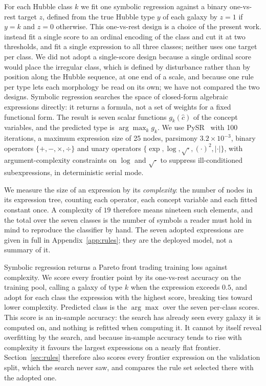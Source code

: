 \documentclass[11pt]{article}
\begin{document}
For each Hubble class $k$ we fit one symbolic regression against a binary
one-vs-rest target $z$, defined from the true Hubble type $y$ of each galaxy by
$z = 1$ if $y = k$ and $z = 0$ otherwise. This one-vs-rest design is a choice
of the present work. \citet{deshpande2026} instead fit a single score to an
ordinal encoding of the class and cut it at two thresholds, and
\citet{llorella2025} fit a single expression to all three classes; neither uses
one target per class. We did not adopt a single-score design because a single
ordinal score would place the irregular class, which is defined
by disturbance rather than by position along the Hubble sequence, at one end of
a scale, and because one rule per type lets each morphology be read on its own;
we have not compared the two designs. Symbolic regression searches the space of
closed-form algebraic expressions directly: it returns a formula, not a set of
weights for a fixed functional form. The result is seven scalar functions
$g_k(\hat c)$ of the concept variables, and the predicted type is
$\arg\max_k g_k$. We use PySR~\citep{cranmer2023} with 100 iterations, a
maximum expression size of 25 nodes, parsimony $3.2\times10^{-3}$, binary
operators $\{+,-,\times,\div\}$ and unary operators
$\{\exp,\log,\sqrt{\cdot},(\cdot)^2,|\cdot|\}$, with argument-complexity
constraints on $\log$ and $\sqrt{\cdot}$ to suppress ill-conditioned
subexpressions, in deterministic serial mode.

We measure the size of an expression by its \emph{complexity}: the number of
nodes in its expression tree, counting each operator, each concept variable
and each fitted constant once. A complexity of $19$ therefore means nineteen
such elements, and the total over the seven classes is the number of symbols a
reader must hold in mind to reproduce the classifier by hand. The seven
adopted expressions are given in full in Appendix~\ref{app:rules}; they are
the deployed model, not a summary of it.

Symbolic regression returns a Pareto front trading training loss against
complexity. We score every frontier point by its one-vs-rest accuracy on the
training pool, calling a galaxy of type $k$ when the expression exceeds $0.5$,
and adopt for each class the expression with the highest score, breaking ties
toward lower complexity. Predicted class is the $\arg\max$ over the seven
per-class scores. This score is an in-sample accuracy: the search has already
seen every galaxy it is computed on, and nothing is refitted when computing it.
It cannot by itself reveal overfitting by the search, and because in-sample
accuracy tends to rise with complexity it favours the largest expressions on a
nearly flat frontier. Section~\ref{sec:rules} therefore also scores every
frontier expression on the validation split, which the search never saw, and
compares the rule set selected there with the adopted one.
\end{document}
